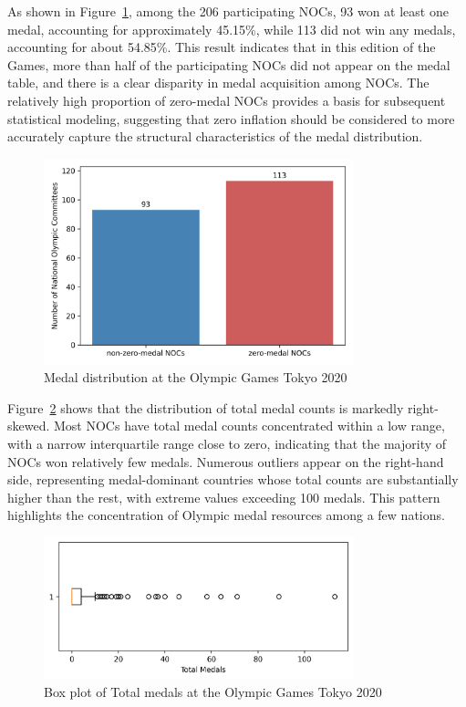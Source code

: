 \documentclass[11pt,twoside]{article}
\numberwithin{Theorem}{section}
\numberwithin{Definition}{section}
\numberwithin{Lemma}{section}
\numberwithin{Algorithm}{section}
\numberwithin{equation}{section}
\begin{document}
As shown in Figure~\ref{fig: Medal distribution at the Olympic Games Tokyo 2020}, among the 206 participating NOCs, 93 won at least one medal, accounting for approximately 45.15\%, while 113 did not win any medals, accounting for about 54.85\%. This result indicates that in this edition of the Games, more than half of the participating NOCs did not appear on the medal table, and there is a clear disparity in medal acquisition among NOCs. The relatively high proportion of zero-medal NOCs provides a basis for subsequent statistical modeling, suggesting that zero inflation should be considered to more accurately capture the structural characteristics of the medal distribution.

\begin{figure}[!ht]
\centering
\includegraphics[width=0.8\textwidth]{zero_vs_nonzero_medals.png}
\caption{Medal distribution at the Olympic Games Tokyo 2020}
\label{fig: Medal distribution at the Olympic Games Tokyo 2020}
\end{figure}

Figure~\ref{fig: Box plot of Total medals at the Olympic Games Tokyo 2020} shows that the distribution of total medal counts is markedly right-skewed. Most NOCs have total medal counts concentrated within a low range, with a narrow interquartile range close to zero, indicating that the majority of NOCs won relatively few medals. Numerous outliers appear on the right-hand side, representing medal-dominant countries whose total counts are substantially higher than the rest, with extreme values exceeding 100 medals. This pattern highlights the concentration of Olympic medal resources among a few nations.

\begin{figure}[!ht]
\centering
\includegraphics[width=0.8\textwidth]{totalmedals_box.png}
\caption{Box plot of Total medals at the Olympic Games Tokyo 2020}
\label{fig: Box plot of Total medals at the Olympic Games Tokyo 2020}
\end{figure}
\end{document}
